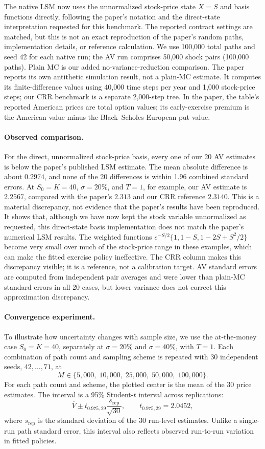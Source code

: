 The native LSM now uses the unnormalized stock-price state \(X=S\) and
basis functions directly, following the paper's notation and the
direct-state interpretation requested for this benchmark. The reported
contract settings are matched, but this is not an exact reproduction of
the paper's random paths, implementation details, or reference
calculation. We use 100,000 total paths
and seed 42 for each native run; the AV run comprises 50,000 shock pairs
(100,000 paths). Plain MC is our added no-variance-reduction comparison.
The paper reports its own antithetic simulation result, not a plain-MC
estimate. It computes its finite-difference values using 40,000 time steps
per year and 1,000 stock-price steps; our CRR benchmark is a separate
2,000-step tree. In the paper, the table's reported American prices are
total option values; its early-exercise premium is the American value minus
the Black--Scholes European put value.
\paragraph{Observed comparison.}
For the direct, unnormalized stock-price basis, every one of our 20 AV
estimates is below the paper's published LSM estimate. The mean absolute
difference is about \(0.2974\), and none of the 20 differences is within
1.96 combined standard errors. At \(S_0=K=40\), \(\sigma=20\%\), and
\(T=1\), for example, our AV estimate is \(2.2567\), compared with the
paper's \(2.313\) and our CRR reference \(2.3140\). This is a material
discrepancy, not evidence that the paper's results have been reproduced.
It shows that, although we have now kept the stock variable unnormalized
as requested, this direct-state basis implementation does not match the
paper's numerical LSM results. The weighted functions
\(e^{-S/2}\{1,1-S,1-2S+S^2/2\}\) become very small over much of the
stock-price range in these examples, which can make the fitted exercise
policy ineffective. The CRR column makes this discrepancy visible; it is
a reference, not a calibration target. AV standard errors are computed
from independent pair averages and were lower than plain-MC standard
errors in all 20 cases, but lower variance does not correct this
approximation discrepancy.


\paragraph{Convergence experiment.}
To illustrate how uncertainty changes with sample size, we use the
at-the-money case \(S_0=K=40\), separately at \(\sigma=20\%\) and
\(\sigma=40\%\), with \(T=1\). Each combination of path count and sampling
scheme is repeated with 30 independent seeds, \(42,\ldots,71\), at
\[
    M\in\{5{,}000,\;10{,}000,\;25{,}000,\;50{,}000,\;100{,}000\}.
\]
For each path count and scheme, the plotted center is the mean of the 30
price estimates. The interval is a 95\% Student-\(t\) interval across
replications:
\[
    \overline V
    \pm t_{0.975,29}\frac{s_{\mathrm{rep}}}{\sqrt{30}},
    \qquad t_{0.975,29}=2.0452,
\]
where \(s_{\mathrm{rep}}\) is the standard deviation of the 30 run-level
estimates. Unlike a single-run path standard error, this interval also
reflects observed run-to-run variation in fitted policies.

